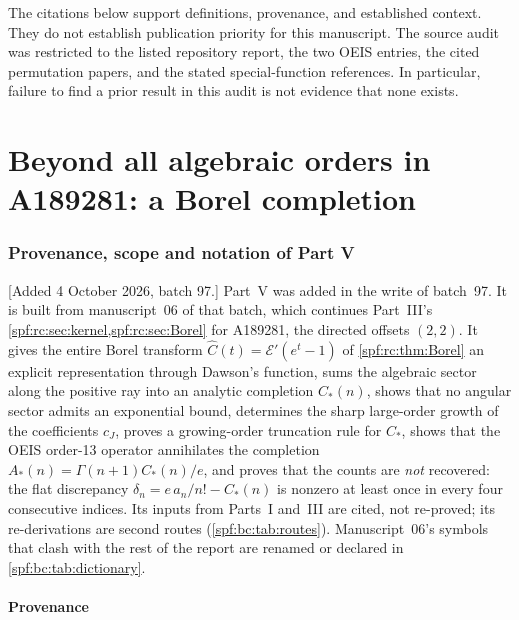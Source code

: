 \documentclass[11pt]{article}
\numberwithin{equation}{section}
\theoremstyle{definition}
\theoremstyle{remark}
\theoremstyle{definition}
\newcommand{\bcC}{C_{\!*}}
\newcommand{\bcA}{A_{\!*}}
\begin{document}
The citations below support definitions, provenance, and established
context. They do not establish publication priority for this manuscript.
The source audit was restricted to the listed repository report, the two
OEIS entries, the cited permutation papers, and the stated special-function
references. In particular, failure to find a prior result in this audit
is not evidence that none exists.

\part{Beyond all algebraic orders in A189281: a Borel completion}
\label{spf:bc:part}

\section{Provenance, scope and notation of Part V}
\label{spf:bc:sec:front}

[Added 4 October 2026, batch 97.] Part~V was added in the write of
batch~97. It is built from manuscript~06 of that batch, which continues
Part~III's \cref{spf:rc:sec:kernel,spf:rc:sec:Borel} for A189281, the
directed offsets $(2,2)$. It gives the entire Borel transform
$\widehat C(t)=\mathcal E'(e^t-1)$ of \cref{spf:rc:thm:Borel} an explicit
representation through Dawson's function, sums the algebraic sector along the
positive ray into an analytic completion $\bcC(n)$, shows that no angular
sector admits an exponential bound, determines the sharp large-order growth
of the coefficients $c_J$, proves a growing-order truncation rule for
$\bcC$, shows that the OEIS order-13 operator annihilates the completion
$\bcA(n)=\Gamma(n+1)\bcC(n)/e$, and proves that the counts are \emph{not}
recovered: the flat discrepancy $\delta_n=e\,a_n/n!-\bcC(n)$ is nonzero at
least once in every four consecutive indices. Its inputs from Parts~I
and~III are cited, not re-proved; its re-derivations are second routes
(\cref{spf:bc:tab:routes}). Manuscript~06's symbols that clash with the rest
of the report are renamed or declared in \cref{spf:bc:tab:dictionary}.

\subsection{Provenance}
\label{spf:bc:sec:provenance}
\end{document}
